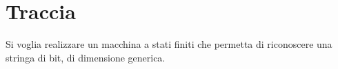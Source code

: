 %

\section{Traccia}

Si voglia realizzare un macchina a stati finiti che permetta di riconoscere
una stringa di bit, di dimensione generica.%

